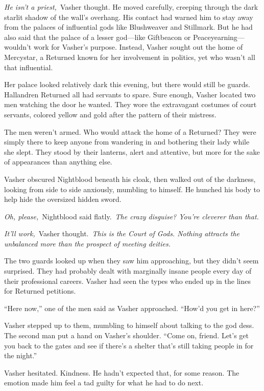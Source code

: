 \textit{He isn’t a priest,}~Vasher thought. He moved carefully, creeping through the dark starlit shadow of the wall’s overhang. His contact had warned him to stay away from the palaces of influential gods like Blushweaver and Stillmark. But he had also said that the palace of a lesser god—like Giftbeacon or Peaceyearning—wouldn’t work for Vasher’s purpose. Instead, Vasher sought out the home of Mercystar, a Returned known for her involvement in politics, yet who wasn’t all that influential.

Her palace looked relatively dark this evening, but there would still be guards. Hallandren Returned all had servants to spare. Sure enough, Vasher located two men watching the door he wanted. They wore the extravagant costumes of court servants, colored yellow and gold after the pattern of their mistress.

The men weren’t armed. Who would attack the home of a Returned? They were simply there to keep anyone from wandering in and bothering their lady while she slept. They stood by their lanterns, alert and attentive, but more for the sake of appearances than anything else.

Vasher obscured Nightblood beneath his cloak, then walked out of the darkness, looking from side to side anxiously, mumbling to himself. He hunched his body to help hide the oversized hidden sword.

\textit{Oh, please,}~Nightblood said flatly.~\textit{The crazy disguise? You’re cleverer than that.}

\textit{It’ll work,}~Vasher thought.~\textit{This is the Court of Gods. Nothing attracts the unbalanced more than the prospect of meeting deities.}

The two guards looked up when they saw him approaching, but they didn’t seem surprised. They had probably dealt with marginally insane people every day of their professional careers. Vasher had seen the types who ended up in the lines for Returned petitions.

“Here now,” one of the men said as Vasher approached. “How’d you get in here?”

Vasher stepped up to them, mumbling to himself about talking to the god dess. The second man put a hand on Vasher’s shoulder. “Come on, friend. Let’s get you back to the gates and see if there’s a shelter that’s still taking people in for the night.”

Vasher hesitated. Kindness. He hadn’t expected that, for some reason. The emotion made him feel a tad guilty for what he had to do next.

